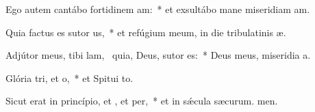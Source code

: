 \item Ego autem cantábo fortidinem am:~* et exsultábo mane miseridiam am.
\item Quia factus es sutor us,~* et refúgium meum, in die tribulatinis æ.
\item Adjútor meus, tibi lam,~\pscross{} quia, Deus, sutor  es:~* Deus meus, miseridia a.
\item Glória tri, et o,~* et Spitui to.
\item Sicut erat in princípio, et , et per,~* et in sǽcula sæcurum. men.
